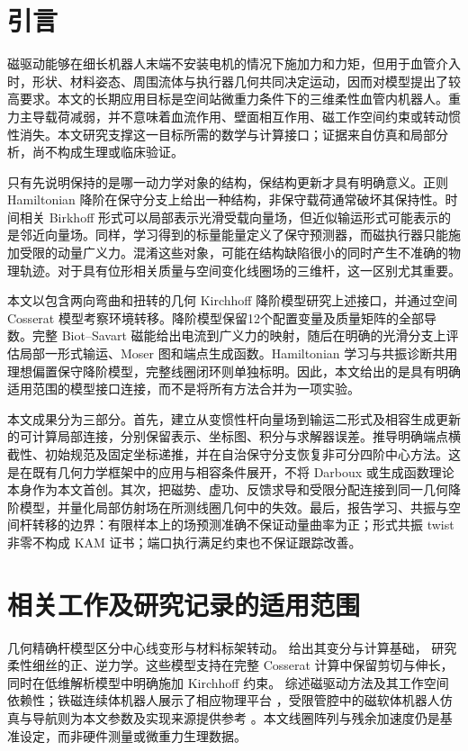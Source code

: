\section{引言}
磁驱动能够在细长机器人末端不安装电机的情况下施加力和力矩，但用于血管介入时，形状、材料姿态、周围流体与执行器几何共同决定运动，因而对模型提出了较高要求。本文的长期应用目标是空间站微重力条件下的三维柔性血管内机器人。重力主导载荷减弱，并不意味着血流作用、壁面相互作用、磁工作空间约束或转动惯性消失。本文研究支撑这一目标所需的数学与计算接口；证据来自仿真和局部分析，尚不构成生理或临床验证。

只有先说明保持的是哪一动力学对象的结构，保结构更新才具有明确意义。正则 Hamiltonian 降阶在保守分支上给出一种结构，非保守载荷通常破坏其保持性。时间相关 Birkhoff 形式可以局部表示光滑受载向量场，但近似输运形式可能表示的是邻近向量场。同样，学习得到的标量能量定义了保守预测器，而磁执行器只能施加受限的动量广义力。混淆这些对象，可能在结构缺陷很小的同时产生不准确的物理轨迹。对于具有位形相关质量与空间变化线圈场的三维杆，这一区别尤其重要。

本文以包含两向弯曲和扭转的几何 Kirchhoff 降阶模型研究上述接口，并通过空间 Cosserat 模型考察环境转移。降阶模型保留12个配置变量及质量矩阵的全部导数。完整 Biot--Savart 磁能给出电流到广义力的映射，随后在明确的光滑分支上评估局部一形式输运、Moser 图和端点生成函数。Hamiltonian 学习与共振诊断共用理想偏置保守降阶模型，完整线圈闭环则单独标明。因此，本文给出的是具有明确适用范围的模型接口连接，而不是将所有方法合并为一项实验。

本文成果分为三部分。首先，建立从变惯性杆向量场到输运二形式及相容生成更新的可计算局部连接，分别保留表示、坐标图、积分与求解器误差。推导明确端点横截性、初始规范及固定坐标递推，并在自治保守分支恢复非可分四阶中心方法。这是在既有几何力学框架中的应用与相容条件展开，不将 Darboux 或生成函数理论本身作为本文首创。其次，把磁势、虚功、反馈求导和受限分配连接到同一几何降阶模型，并量化局部仿射场在所测线圈几何中的失效。最后，报告学习、共振与空间杆转移的边界：有限样本上的场预测准确不保证动量曲率为正；形式共振 twist 非零不构成 KAM 证书；端口执行满足约束也不保证跟踪改善。

\section{相关工作及研究记录的适用范围}
几何精确杆模型区分中心线变形与材料标架转动。\citet{Antman2005,Simo1985} 给出其变分与计算基础，\citet{Gazzola2018} 研究柔性细丝的正、逆力学。这些模型支持在完整 Cosserat 计算中保留剪切与伸长，同时在低维解析模型中明确施加 Kirchhoff 约束。\citet{Abbott2020} 综述磁驱动方法及其工作空间依赖性；铁磁连续体机器人展示了相应物理平台 \citep{Kim2019}，受限管腔中的磁软体机器人仿真与导航则为本文参数及实现来源提供参考 \citep{Tong2025}。本文线圈阵列与残余加速度仍是基准设定，而非硬件测量或微重力生理数据。

